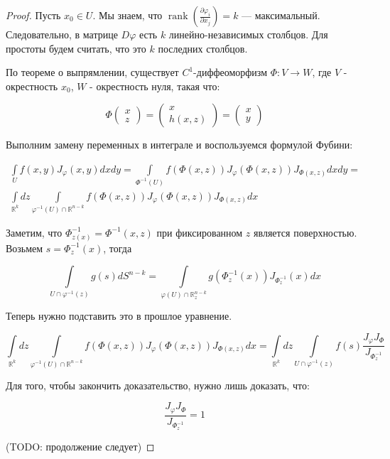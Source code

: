\documentclass[a5paper]{article}
\theoremstyle{plain}
\theoremstyle{definition}
\numberwithin{through}{section}
\numberwithin{equation}{section}
\DeclareMathOperator{\rank}{rank}
\begin{document}
\begin{proof}
	Пусть $x_0 \in U$. Мы знаем, что $\rank (\frac{\partial \varphi_i}{\partial x_j}) = k$ --- максимальный. Следовательно, в матрице $D \varphi$ есть $k$ линейно-независимых столбцов. Для простоты будем считать, что это $k$ последних столбцов.
	
	По теореме о выпрямлении, существует $C^1$-диффеоморфизм $\varPhi : V \to W$, где $V$ - окрестность $x_0$, $W$ - окрестность нуля, такая что:
	
	\begin{equation*}
		\varPhi 
		\begin{pmatrix}
			x \\
			z
		\end{pmatrix}
		=
		\begin{pmatrix}
			x \\
			h(x, z)
		\end{pmatrix}
		=
		\begin{pmatrix}
			x \\
			y
		\end{pmatrix}
	\end{equation*}
	
	Выполним замену переменных в интеграле и воспользуемся формулой Фубини:
	
	\begin{align*}
		\int\limits_{U} f(x,y) J_{\varphi} (x, y) dx dy = \int\limits_{\varPhi^{-1}(U)} f(\varPhi (x, z)) J_{\varphi} (\varPhi (x, z)) J_{\varPhi(x, z)} dx dy = \\
		\int\limits_{\mathbb{R}^k} dz \int\limits_{\varphi^{-1}(U) \cap \mathbb{R}^{n-k}} f(\varPhi (x, z)) J_{\varphi} (\varPhi (x, z)) J_{\varPhi(x, z)} dx
	\end{align*}
	
	Заметим, что $\varPhi^{-1}_{z(x)} = \varPhi^{-1}(x, z)$ при фиксированном $z$ является поверхностью. Возьмем $s=\varPhi^{-1}_z(x)$, тогда
	
	\begin{equation*}
		\int\limits_{U \cap \varphi^{-1}(z)} g(s) dS^{n-k} = \int\limits_{\varphi(U) \cap \mathbb{R}^{n-k}_z} g(\varPhi_z^{-1}(x)) J_{\varPhi^{-1}_z}(x) dx
	\end{equation*}
	
	Теперь нужно подставить это в прошлое уравнение.
	
	\begin{equation*}
	\int\limits_{\mathbb{R}^k} dz \int\limits_{\varphi^{-1}(U) \cap \mathbb{R}^{n-k}} f(\varPhi (x, z)) J_{\varphi} (\varPhi (x, z)) J_{\varPhi(x, z)} dx = \int\limits_{\mathbb{R}^k} dz \int\limits_{U \cap \varphi^{-1}(z)} f(s) \frac{J_{\varphi} J_{\varPhi}}{J_{\varPhi^{-1}_z}}
	\end{equation*}
	
	Для того, чтобы закончить доказательство, нужно лишь доказать, что:
	
	\begin{equation*}
		\frac{J_{\varphi} J_{\varPhi}}{J_{\varPhi^{-1}_z}} = 1
	\end{equation*}
	
	(TODO: продолжение следует)
\end{proof}
\end{document}
